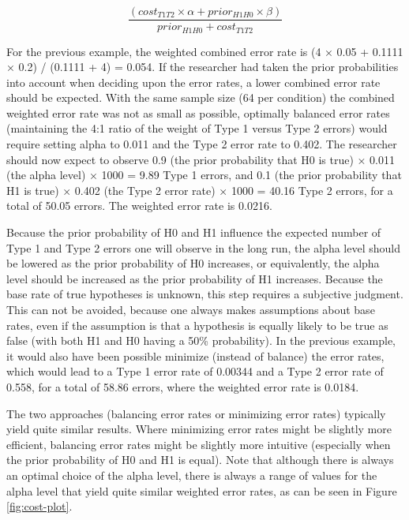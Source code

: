 \documentclass[
  english,
  ,jou, a4paper,floatsintext]{apa6}
\begin{document}
\begin{equation}
\frac{(cost_{T1T2} \times \alpha + prior_{H1H0} \times \beta)}{prior_{H1H0}+cost_{T1T2}}
\label{eq:minimize}
\end{equation}

For the previous example, the weighted combined error rate is (4 × 0.05 + 0.1111 × 0.2) / (0.1111 + 4) = 0.054. If the researcher had taken the prior probabilities into account when deciding upon the error rates, a lower combined error rate should be expected. With the same sample size (64 per condition) the combined weighted error rate was not as small as possible, optimally balanced error rates (maintaining the 4:1 ratio of the weight of Type 1 versus Type 2 errors) would require setting alpha to 0.011 and the Type 2 error rate to 0.402. The researcher should now expect to observe 0.9 (the prior probability that H0 is true) × 0.011 (the alpha level) × 1000 = 9.89 Type 1 errors, and 0.1 (the prior probability that H1 is true) × 0.402 (the Type 2 error rate) × 1000 = 40.16 Type 2 errors, for a total of 50.05 errors. The weighted error rate is 0.0216.

Because the prior probability of H0 and H1 influence the expected number of Type 1 and Type 2 errors one will observe in the long run, the alpha level should be lowered as the prior probability of H0 increases, or equivalently, the alpha level should be increased as the prior probability of H1 increases. Because the base rate of true hypotheses is unknown, this step requires a subjective judgment. This can not be avoided, because one always makes assumptions about base rates, even if the assumption is that a hypothesis is equally likely to be true as false (with both H1 and H0 having a 50\% probability). In the previous example, it would also have been possible minimize (instead of balance) the error rates, which would lead to a Type 1 error rate of 0.00344 and a Type 2 error rate of 0.558, for a total of 58.86 errors, where the weighted error rate is 0.0184.

The two approaches (balancing error rates or minimizing error rates) typically yield quite similar results. Where minimizing error rates might be slightly more efficient, balancing error rates might be slightly more intuitive (especially when the prior probability of H0 and H1 is equal). Note that although there is always an optimal choice of the alpha level, there is always a range of values for the alpha level that yield quite similar weighted error rates, as can be seen in Figure \ref{fig:cost-plot}.
\end{document}
